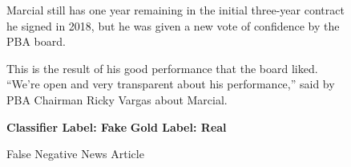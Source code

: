 \begin{figure}[h!]
{{                              \small \raggedright Marcial still has one year remaining in the initial three-year contract he signed in 2018, but he was given a new vote of confidence by the PBA board.\linebreak

                              \small \raggedright This is the result of his good performance that the board liked. “We’re open and very transparent about his performance,” said by PBA Chairman Ricky Vargas about Marcial. \linebreak
                                \linebreak\linebreak

                                \textbf{Classifier Label: Fake} \newline
                                \textbf{Gold Label: Real}

                            }
                          }
                             \caption{False Negative News Article}
                                \label{fig:false-negative-news-article}
                            \end{figure}

